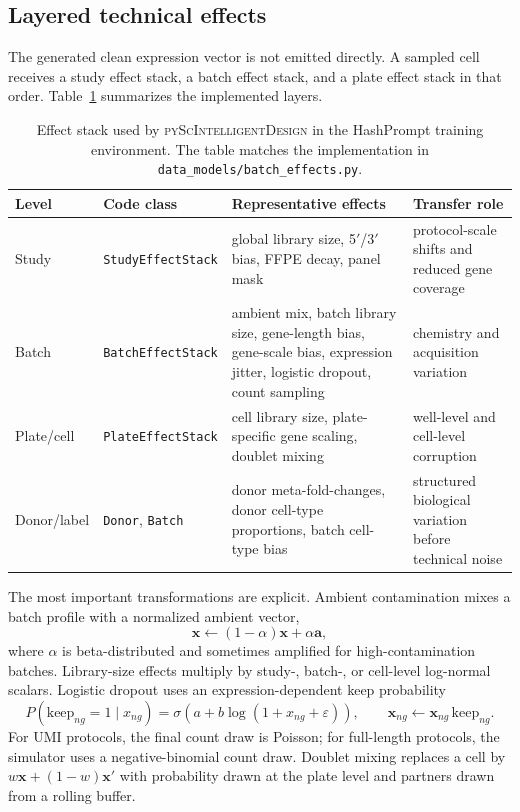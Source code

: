 \documentclass{article}
\newcommand{\eps}{\varepsilon}
\begin{document}
\subsection{Layered technical effects}

The generated clean expression vector is not emitted directly. A sampled cell receives a study effect stack, a batch effect stack, and a plate effect stack in that order. Table~\ref{tab:effect_stack} summarizes the implemented layers.

\begin{table}[t]
\centering
\small
\setlength{\tabcolsep}{4pt}
\caption{Effect stack used by \textsc{pyScIntelligentDesign} in the HashPrompt training environment. The table matches the implementation in \texttt{data\_models/batch\_effects.py}.}
\label{tab:effect_stack}
\begin{tabularx}{\textwidth}{@{}lllX@{}}
\toprule
\textbf{Level} & \textbf{Code class} & \textbf{Representative effects} & \textbf{Transfer role} \\
\midrule
Study & \texttt{StudyEffectStack} & global library size, 5$'$/$3'$ bias, FFPE decay, panel mask & protocol-scale shifts and reduced gene coverage \\
Batch & \texttt{BatchEffectStack} & ambient mix, batch library size, gene-length bias, gene-scale bias, expression jitter, logistic dropout, count sampling & chemistry and acquisition variation \\
Plate/cell & \texttt{PlateEffectStack} & cell library size, plate-specific gene scaling, doublet mixing & well-level and cell-level corruption \\
Donor/label & \texttt{Donor}, \texttt{Batch} & donor meta-fold-changes, donor cell-type proportions, batch cell-type bias & structured biological variation before technical noise \\
\bottomrule
\end{tabularx}
\end{table}

The most important transformations are explicit. Ambient contamination mixes a batch profile with a normalized ambient vector,
\begin{equation}
    \mathbf{x}\leftarrow (1-\alpha)\mathbf{x}+\alpha\mathbf{a},
\end{equation}
where \(\alpha\) is beta-distributed and sometimes amplified for high-contamination batches. Library-size effects multiply by study-, batch-, or cell-level log-normal scalars. Logistic dropout uses an expression-dependent keep probability
\begin{equation}
    P(\text{keep}_{ng}=1\mid x_{ng})=\sigma(a+b\log(1+x_{ng}+\eps)),
    \qquad \mathbf{x}_{ng}\leftarrow \mathbf{x}_{ng}\,\text{keep}_{ng}.
\end{equation}
For UMI protocols, the final count draw is Poisson; for full-length protocols, the simulator uses a negative-binomial count draw. Doublet mixing replaces a cell by \(w\mathbf{x}+(1-w)\mathbf{x}'\) with probability drawn at the plate level and partners drawn from a rolling buffer.
\end{document}
